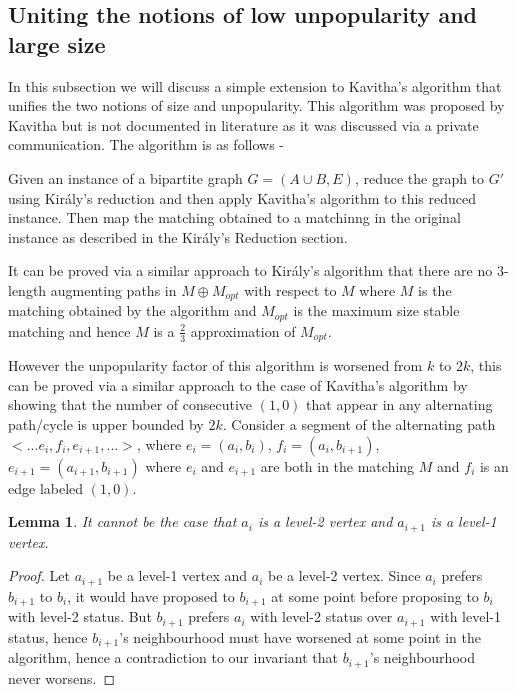 \documentclass[a4paper,10pt]{article}
\theoremstyle{plain} %
\newtheorem{lemma}[theorem]{Lemma} %
\theoremstyle{plain} %
\begin{document}
\subsection{Uniting the notions of low unpopularity and large size}
In this subsection we will discuss a simple extension to Kavitha's algorithm that unifies the two notions of size and unpopularity. This algorithm was proposed by Kavitha but is not documented in literature as it was discussed via a private communication. The algorithm is as follows - 

Given an instance of a bipartite graph $G = (A \cup B, E)$, reduce the graph to $G'$ using Király's reduction and then apply Kavitha's algorithm to this reduced instance. Then map the matching obtained to a matchinng in the original instance as described in the Király's Reduction section.

It can be proved via a similar approach to Király's algorithm that there are no 3-length augmenting paths in $M \oplus M_{opt}$ with respect to $M$ where $M$ is the matching obtained by the algorithm and $M_{opt}$ is the maximum size stable matching and hence $M$ is a $\frac{2}{3}$ approximation of $M_{opt}$. 

However the unpopularity factor of this algorithm is worsened from $k$ to $2k$, this can be proved via a similar approach to the case of Kavitha's algorithm by showing that the number of consecutive $(1, 0)$ that appear in any alternating path/cycle is upper bounded by $2k$. Consider a segment of the alternating path $<... e_i, f_i, e_{i+1}, ...>$, where $e_i = (a_i, b_i)$, $f_i = (a_i, b_{i+1})$, $ e_{i+1} = (a_{i+1}, b_{i+1})$ where $e_i$ and $e_{i+1}$ are both in the matching $M$ and $f_i$ is an edge labeled $(1, 0)$. 

\begin{lemma}
    It cannot be the case that $a_{i}$ is a level-2 vertex and $a_{i+1}$ is a level-1 vertex.
\end{lemma}

\begin{proof}
    Let $a_{i+1}$ be a level-1 vertex and $a_i$ be a level-2 vertex. Since $a_i$ prefers $b_{i+1}$ to $b_i$, it would have proposed to $b_{i+1}$ at some point before proposing to $b_i$ with level-2 status. But $b_{i+1}$ prefers $a_i$ with level-2 status over $a_{i+1}$ with level-1 status, hence $b_{i+1}$'s neighbourhood must have worsened at some point in the algorithm, hence a contradiction to our invariant that $b_{i+1}$'s neighbourhood never worsens.
\end{proof}
\end{document}
